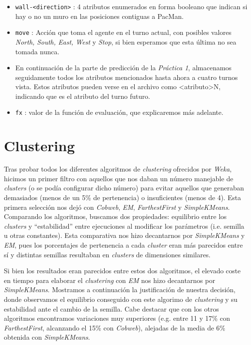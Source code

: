 \documentclass[12pt]{article}
\begin{document}
\begin{itemize}
    \item \texttt{wall-\textless direction\textgreater} : 4 atributos enumerados en forma booleano que indican si hay o no un muro en las posiciones contiguas a PacMan.
    \item \texttt{move} : Acción que toma el agente en el turno actual, con posibles valores \emph{North, South, East, West} y \emph {Stop}, si bien esperamos que esta última no sea tomada nunca.
    \item En continuación de la parte de predicción de la \emph{Práctica 1}, almacenamos seguidamente todos los atributos mencionados hasta ahora a cuatro turnos vista. Estos atributos pueden verse en el archivo como \textless atributo\textgreater N, indicando que es el atributo del turno futuro.
    \item \texttt{fx} : valor de la función de evaluación, que explicaremos más adelante.
\end{itemize}

\section{Clustering}


Tras probar todos los diferentes algoritmos de \emph{clustering} ofrecidos por \emph{Weka}, hicimos un primer filtro con aquellos que nos daban un número manejable de \emph{clusters} (o se podía configurar dicho número) para evitar aquellos que generaban demasiados (menos de un 5\% de pertenencia) o insuficientes (menos de 4). Esta primera selección nos dejó con \emph{Cobweb}, \emph{EM}, \emph{FarthestFirst} y \emph{SimpleKMeans}. Comparando los algoritmos, buscamos dos propiedades: equilibrio entre los \emph{clusters} y ``estabilidad'' entre ejecuciones al modificar los parámetros (i.e. semilla u otras constantes). Esta comparativa nos hizo decantarnos por \emph{SimpleKMeans} y \emph{EM}, pues los porcentajes de pertenencia a cada \emph{cluster} eran más parecidos entre sí y distintas semillas resultaban en \emph{clusters} de dimensiones similares.

Si bien los resultados eran parecidos entre estos dos algoritmos, el elevado coste en tiempo para elaborar el \emph{clustering} con \emph{EM} nos hizo decantarnos por \emph{SimpleKMeans}. Mostramos a continuación la justificación de nuestra decisión, donde observamos el equilibrio conseguido con este algorimo de \emph{clustering} y su estabilidad ante el cambio de la semilla. Cabe destacar que con los otros algoritmos encontramos variaciones muy superiores (e.g. entre 11 y 17\% con \emph{FarthestFirst}, alcanzando el 15\% con \emph{Cobweb}), alejadas de la media de 6\% obtenida con \emph{SimpleKMeans}.
\end{document}
